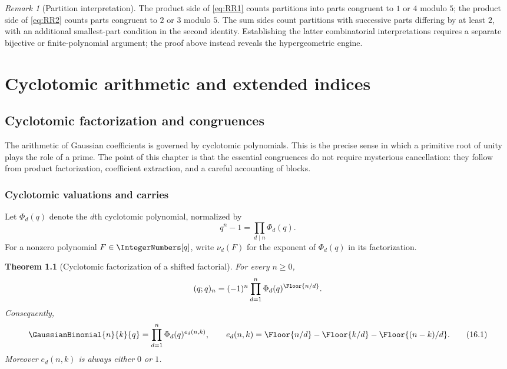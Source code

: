 \documentclass[11pt,a4paper,oneside,openany]{book}
\newtheorem{theorem}{Theorem}[chapter]
\theoremstyle{definition}
\theoremstyle{remark}
\newtheorem{remark}[remark]{Remark}
\begin{document}
\begin{remark}[Partition interpretation]
The product side of \eqref{eq:RR1} counts partitions into parts congruent to $1$ or $4$ modulo $5$; the product side of \eqref{eq:RR2} counts parts congruent to $2$ or $3$ modulo $5$.  The sum sides count partitions with successive parts differing by at least $2$, with an additional smallest-part condition in the second identity.  Establishing the latter combinatorial interpretations requires a separate bijective or finite-polynomial argument; the proof above instead reveals the hypergeometric engine.
\end{remark}




\part{Cyclotomic arithmetic and extended indices}

\chapter{Cyclotomic factorization and congruences}\label{chap:cyclotomic}

The arithmetic of Gaussian coefficients is governed by cyclotomic polynomials.  This is the precise sense in which a primitive root of unity plays the role of a prime.  The point of this chapter is that the essential congruences do not require mysterious cancellation: they follow from product factorization, coefficient extraction, and a careful accounting of blocks.

\section{Cyclotomic valuations and carries}

Let $\Phi_d(q)$ denote the $d$th cyclotomic polynomial, normalized by
\[
 q^n-1=\prod_{d\mid n}\Phi_d(q).
\]
For a nonzero polynomial $F\in\IntegerNumbers[q]$, write $\nu_d(F)$ for the exponent of $\Phi_d(q)$ in its factorization.

\begin{theorem}[Cyclotomic factorization of a shifted factorial]\label{thm:cyclotomic-pochhammer}
For every $n\ge0$,
\[
 (q;q)_n=(-1)^n\prod_{d=1}^{n}\Phi_d(q)^{\Floor{n/d}}.
\]
Consequently,
\[
 \GaussianBinomial{n}{k}{q}
 =\prod_{d=1}^{n}\Phi_d(q)^{e_d(n,k)},
 \qquad
 e_d(n,k)=\Floor{n/d}-\Floor{k/d}-\Floor{(n-k)/d}.
 \tag{16.1}\label{eq:cyclotomic-gaussian}
\]
Moreover $e_d(n,k)$ is always either $0$ or $1$.
\end{theorem}
\end{document}
